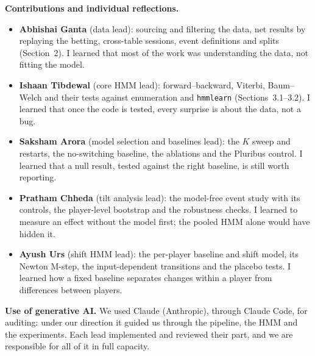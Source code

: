 \textbf{Contributions and individual reflections.}
\begin{itemize}
\item \textbf{Abhishai Ganta} (data lead): sourcing and filtering the data, net results by replaying the betting, cross-table sessions, event definitions and splits (Section~2). I learned that most of the work was understanding the data, not fitting the model.
\item \textbf{Ishaan Tibdewal} (core HMM lead): forward--backward, Viterbi, Baum--Welch and their tests against enumeration and \texttt{hmmlearn} (Sections~3.1--3.2). I learned that once the code is tested, every surprise is about the data, not a bug.
\item \textbf{Saksham Arora} (model selection and baselines lead): the $K$ sweep and restarts, the no-switching baseline, the ablations and the Pluribus control. I learned that a null result, tested against the right baseline, is still worth reporting.
\item \textbf{Pratham Chheda} (tilt analysis lead): the model-free event study with its controls, the player-level bootstrap and the robustness checks. I learned to measure an effect without the model first; the pooled HMM alone would have hidden it.
\item \textbf{Ayush Urs} (shift HMM lead): the per-player baseline and shift model, its Newton M-step, the input-dependent transitions and the placebo tests. I learned how a fixed baseline separates changes within a player from differences between players.
\end{itemize}

\textbf{Use of generative AI.} We used Claude (Anthropic), through Claude Code, for auditing: under our direction it guided us through the pipeline, the HMM and the experiments. Each lead implemented and reviewed their part, and we are responsible for all of it in full capacity.

